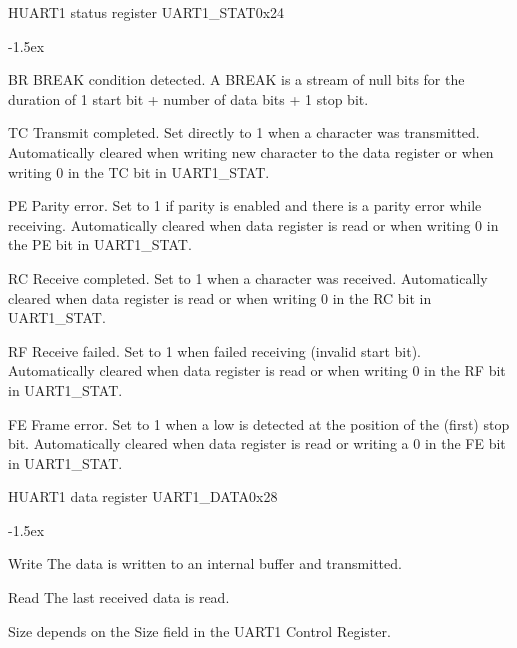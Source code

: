 \documentclass[12pt]{article}
\begin{document}
\begin{register}{H}{UART1 status register UART1\_STAT}{0x24}
\label{uart1stat}
%
%
%
%
%
%
\regnewline%
\end{register}
\begin{regdesc}[0.8\textwidth]\begin{reglist}[0000]
\itemsep-1.5ex
\item[BR] BREAK condition detected. A BREAK is a stream of null bits for the duration of 1 start bit + number of data bits + 1 stop bit.
\item[TC] Transmit completed. Set directly to 1 when a character was transmitted. Automatically cleared when writing new character to the data register or when writing 0 in the TC bit in \mbox{UART1\_STAT}.
\item[PE] Parity error. Set to 1 if parity is enabled and there is a parity error while receiving. Automatically cleared when data register is read or when writing 0 in the PE bit in UART1\_STAT.
\item[RC] Receive completed. Set to 1 when a character was received. Automatically cleared when data register is read or when writing 0 in the RC bit in UART1\_STAT.
\item[RF] Receive failed. Set to 1 when failed receiving (invalid start bit). Automatically cleared when data register is read or when writing 0 in the RF bit in UART1\_STAT.
\item [FE] Frame error. Set to 1 when a low is detected at the position of the (first) stop bit. Automatically cleared when data register is read or writing a 0 in the FE bit in UART1\_STAT.
\end{reglist}\end{regdesc}

\begin{register}{H}{UART1 data register UART1\_DATA}{0x28}
\label{uart1data}
%
\regnewline%
\end{register}
\begin{regdesc}[0.6\textwidth]\begin{reglist}[000000000]
\itemsep-1.5ex
\item[Write] The data is written to an internal buffer and transmitted.
\item[Read] The last received data is read.
\end{reglist}\end{regdesc}
\hspace*{2cm}Size depends on the Size field in the UART1 Control Register.
\end{document}
